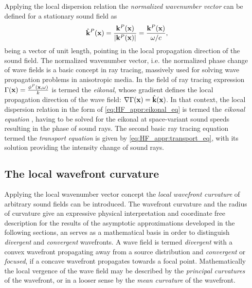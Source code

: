 Applying the local dispersion relation the \emph{normalized wavenumber vector} can be defined for a stationary sound field as
\begin{equation}
\hat{\mathbf{k}}^P(\mathbf{x}) = \frac{\mathbf{k}^P(\mathbf{x})}{|\mathbf{k}^P(\mathbf{x})|} = \frac{\mathbf{k}^P(\mathbf{x})}{\omega/c},
\end{equation}
being a vector of unit length, pointing in the local propagation direction of the sound field.
%
The normalized wavenumber vector, i.e. the normalized phase change of wave fields is a basic concept in ray tracing, massively used for solving wave propagation problems in anisotropic media.
In the field of ray tracing expression $\Gamma(\mathbf{x}) = \frac{\phi^P(\mathbf{x},\omega)}{k}$ is termed the \emph{eikonal}, whose gradient defines the local propagation direction of the wave field: $\nabla \Gamma(\mathbf{x}) = \hat{\mathbf{k}}(\mathbf{x})$.
In that context, the local dispersion relation in the form of \eqref{eq:HF_appr:eikonal_eq} is termed the \emph{eikonal equation} \cite{Kinsler2000, Pierce1991}, having to be solved for the eikonal at space-variant sound speeds resulting in the phase of sound rays.
The second basic ray tracing equation termed the \emph{transport equation} is given by \eqref{eq:HF_appr:transport_eq}, with its solution providing the intensity change of sound rays.

\subsection{The local wavefront curvature}
%
Applying the local wavenumber vector concept the \emph{local wavefront curvature} of arbitrary sound fields can be introduced.
The wavefront curvature and the radius of curvature give an expressive physical interpretation and coordinate free description for the results of the asymptotic approximations developed in the following sections, an serves as a mathematical basis in order to distinguish \emph{divergent} and \emph{convergent} wavefronts.
A wave field is termed \emph{divergent} with a convex wavefront propagating away from a source distribution and \emph{convergent} or \emph{focused}, if a concave wavefront propagates towards a focal point.
Mathematically the local vergence of the wave field may be described by the \emph{principal curvatures} of the wavefront, or in a looser sense by the \emph{mean curvature} of the wavefront.

